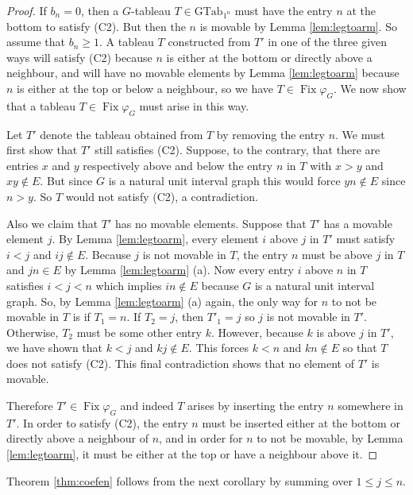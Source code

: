 \documentclass[10pt,a4paper]{amsart}
\theoremstyle{definition}
\theoremstyle{remark}
\numberwithin{equation}{section}
\DeclareMathOperator{\Fix}{Fix}
\begin{document}
\begin{proof}
If $b_n=0$, then a $G$-tableau $T\in\text{GTab}_{1^n}$ must have the entry $n$ at the bottom to satisfy (C2).
But then the $n$ is movable by Lemma \ref{lem:legtoarm}. So assume that $b_n\geq 1$. A tableau $T$ constructed from $T'$ in one of the three given ways will satisfy (C2) because $n$ is either at the bottom or directly above a neighbour, and will have no movable elements by Lemma \ref{lem:legtoarm} because $n$ is either at the top or below a neighbour, so we have $T\in\Fix\varphi_G$. We now show that a tableau $T\in\Fix\varphi_G$ must arise in this way. 

Let $T'$ denote the tableau obtained from $T$ by removing the entry $n$. 
We must first show that $T'$ still satisfies (C2).  Suppose, to the contrary, that 
there are entries $x$ and $y$ respectively above and below the entry $n$ in $T$ with $x>y$ and $xy\notin E$. But since  $G$ is a natural unit interval graph this would force $yn\notin E$ since $n>y$.  So $T$ would not satisfy (C2), a contradiction.

Also we claim that  $T'$ has no movable elements. Suppose that $T'$ has a movable element  $j$. By Lemma \ref{lem:legtoarm}, every element $i$ above $j$ in $T'$ must satisfy $i<j$ and $ij\notin E$. Because $j$ is not movable in $T$, the entry $n$ must be above $j$ in $T$ and $jn\in E$ by Lemma \ref{lem:legtoarm} (a). Now every entry $i$ above $n$ in $T$ satisfies $i<j<n$ which implies $in\notin E$ because $G$ is a natural unit interval graph. 
So, by Lemma \ref{lem:legtoarm} (a) again, the only way for $n$ to not be movable in $T$ is if 
$T_1=n$. If $T_2=j$, then $T'_1=j$ so $j$ is not movable in $T'$.  Otherwise, $T_2$ must be some other entry $k$. However, because $k$ is above $j$ in $T'$, we have shown that $k<j$ and $kj\notin E$. 
This  forces $k<n$ and $kn\notin E$ so that $T$ does not satisfy (C2). 
 This final contradiction shows that no element of $T'$ is movable.


Therefore $T'\in\Fix\varphi_G$ and indeed $T$ arises by inserting the entry $n$ somewhere in $T'$. In order to satisfy (C2), the entry $n$ must be inserted either at the bottom or directly above a neighbour of $n$, and in order for $n$ to not be movable, by Lemma \ref{lem:legtoarm}, it must be either at the top or have a neighbour above it.
\end{proof}

Theorem \ref{thm:coefen} follows from the next corollary by summing over $1\leq j\leq n$.
\end{document}
